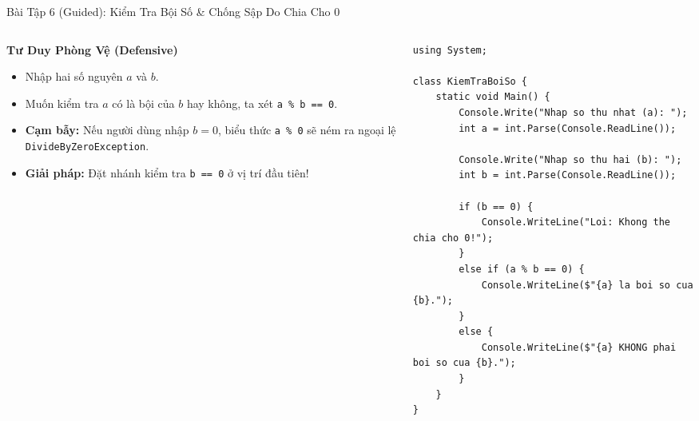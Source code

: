 \documentclass[aspectratio=169, 10pt]{beamer}
\begin{document}
\begin{frame}[fragile]{Bài Tập 6 (Guided): Kiểm Tra Bội Số \& Chống Sập Do Chia Cho 0}
  \begin{columns}[T]
    \begin{column}{0.45\textwidth}
      \begin{block}{\textbf{Tư Duy Phòng Vệ (Defensive)}}
        \begin{itemize}
          \item Nhập hai số nguyên $a$ và $b$.
          \item Muốn kiểm tra $a$ có là bội của $b$ hay không, ta xét \texttt{a \% b == 0}.
          \item \textbf{Cạm bẫy:} Nếu người dùng nhập $b = 0$, biểu thức \texttt{a \% 0} sẽ ném ra ngoại lệ \texttt{DivideByZeroException}.
          \item \textbf{Giải pháp:} Đặt nhánh kiểm tra \texttt{b == 0} ở vị trí đầu tiên!
        \end{itemize}
      \end{block}
    \end{column}
    \begin{column}{0.53\textwidth}
\begin{lstlisting}[basicstyle=\ttfamily\tiny]
using System;

class KiemTraBoiSo {
    static void Main() {
        Console.Write("Nhap so thu nhat (a): ");
        int a = int.Parse(Console.ReadLine());

        Console.Write("Nhap so thu hai (b): ");
        int b = int.Parse(Console.ReadLine());

        if (b == 0) {
            Console.WriteLine("Loi: Khong the chia cho 0!");
        }
        else if (a % b == 0) {
            Console.WriteLine($"{a} la boi so cua {b}.");
        }
        else {
            Console.WriteLine($"{a} KHONG phai boi so cua {b}.");
        }
    }
}
\end{lstlisting}
    \end{column}
  \end{columns}
\end{frame}
\end{document}

